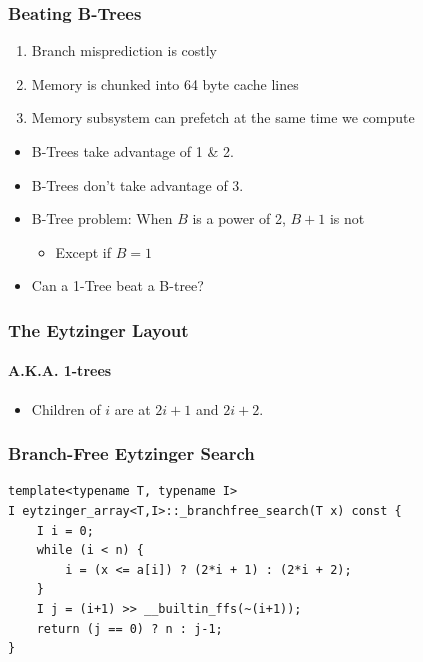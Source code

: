 \documentclass[xcolor=dvipsnames]{beamer}
\begin{document}
\begin{frame}
   \frametitle{Beating B-Trees}

   \begin{enumerate}[<+->]
      \item Branch misprediction is costly
      \item Memory is chunked into 64 byte cache lines
      \item Memory subsystem can prefetch at the same time we compute
   \end{enumerate}
   \begin{itemize}[<+->]
      \item B-Trees take advantage of 1 \& 2.
      \item B-Trees don't take advantage of 3.
      \item B-Tree problem: When $B$ is a power of 2, $B+1$ is not
      \begin{itemize}[<+->]
        \item Except if $B=1$
      \end{itemize}
      \item Can a 1-Tree beat a B-tree?
   \end{itemize}
\end{frame}

\begin{frame}
   \frametitle{The Eytzinger Layout}
   \framesubtitle{A.K.A. 1-trees}
  
   \begin{center}
   \end{center} 
   \begin{itemize}
     \item Children of $i$ are at $2i+1$ and $2i+2$.
   \end{itemize}
\end{frame}

\begin{frame}[fragile]
   \frametitle{Branch-Free Eytzinger Search}

{\small 
\begin{verbatim}
template<typename T, typename I>
I eytzinger_array<T,I>::_branchfree_search(T x) const {
    I i = 0;
    while (i < n) {
        i = (x <= a[i]) ? (2*i + 1) : (2*i + 2);
    }
    I j = (i+1) >> __builtin_ffs(~(i+1));
    return (j == 0) ? n : j-1;
}
\end{verbatim} 
}
\end{frame}
\end{document}
